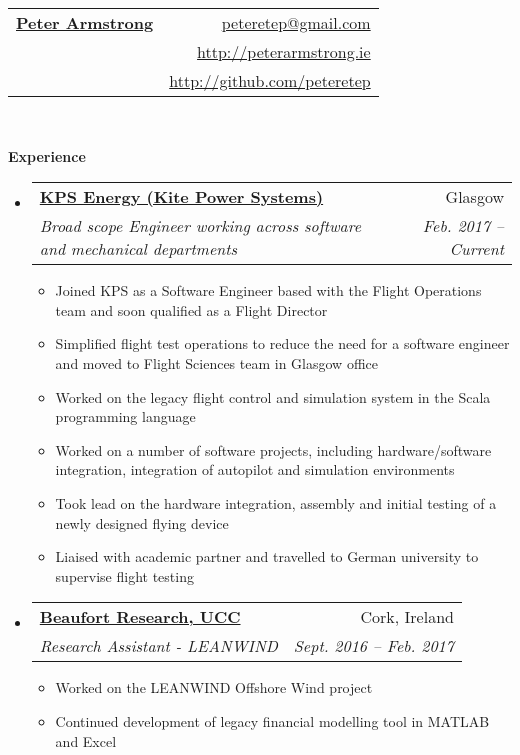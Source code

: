 \documentclass[letterpaper,11pt]{article}
\makeatletter
\newcommand{\resitem}[1]{\item #1 \vspace{-2pt}}
\newcommand{\resheading}[1]{{\large \colorbox{mygrey}{\begin{minipage}{\textwidth}{\textbf{#1 \vphantom{p\^{E}}}}\end{minipage}}}}
\newcommand{\ressubheading}[4]{
\begin{tabular*}{6.5in}{l@{\extracolsep{\fill}}r}
		\textbf{#1} & #2 \\
		\textit{#3} & \textit{#4} \\
\end{tabular*}\vspace{-6pt}}
\makeatother
\begin{document}
\newcommand{\mywebheader}{
\begin{tabular*}{7in}{l@{\extracolsep{\fill}}r}
	\textbf{\href{http://peterarmstrong.ie/}{\LARGE Peter Armstrong}} & \href{mailto:peteretep@gmail.com}{peteretep@gmail.com}\\
	& \href{http://peterarmstrong.ie}{http://peterarmstrong.ie} \\
	& \href{http://github.com/peteretep}{http://github.com/peteretep}
	\end{tabular*}
\\
\vspace{0.1in}}

\mywebheader

\resheading{Experience}
  

	\begin{itemize}
    \item 
      \ressubheading{\href{http://www.kps.energy}{KPS Energy (Kite Power Systems)}}{Glasgow}
        {Broad scope Engineer working across software and mechanical departments }{Feb. 2017 -- Current}
        {
        \begin{itemize}
          \resitem{Joined KPS as a Software Engineer based with the Flight Operations team and soon qualified as a Flight Director}
          \resitem{Simplified flight test operations to reduce the need for a software engineer and moved to Flight Sciences team in Glasgow office}
          \resitem{Worked on the legacy flight control and simulation system in the Scala programming language}
          \resitem{Worked on a number of software projects, including hardware/software integration, integration of autopilot and simulation environments}
          \resitem{Took lead on the hardware integration, assembly and initial testing of a newly designed flying device }
          \resitem{Liaised with academic partner and travelled to German university to supervise flight testing}
			
        \end{itemize}
        }
        \item 
      \ressubheading{\href{http://www.ucc.ie}{Beaufort Research, UCC}}{Cork, Ireland}
        {Research Assistant - LEANWIND}{Sept. 2016 -- Feb. 2017  }
        {
        \begin{itemize}
          \resitem{Worked on the LEANWIND Offshore Wind project}
          \resitem{Continued development of legacy financial modelling tool in MATLAB and Excel}
        \end{itemize}
        }


\end{itemize}
\end{document}
